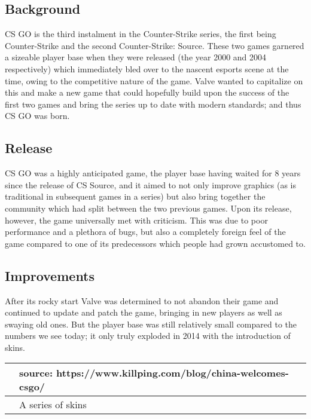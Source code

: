 \documentclass[a4paper,10pt]{book}
\begin{document}
 \subsection{Background }
 
          CS GO is the third instalment in the Counter-Strike series, the first being Counter-Strike and the
          second Counter-Strike: Source. These two games garnered a sizeable player base when they were
          released (the year 2000 and 2004 respectively) which immediately bled over to the nascent esports
          scene at the time, owing to the competitive nature of the game. Valve wanted to capitalize on this
          and make a new game that could hopefully build upon the success of the first two games and bring the
          series up to date with modern standards; and thus CS GO was born.
         
 
 \subsection{Release }
 
          CS GO was a highly anticipated game, the player base having waited for 8 years since the release of
          CS Source, and it aimed to not only improve graphics (as is traditional in subsequent games in a
          series) but also bring together the community which had split between the two previous
          games. Upon its release, however, the game universally met with criticism. This was due to poor
          performance and a plethora of bugs, but also a completely foreign feel of the game compared to
          one of its predecessors which people had grown accustomed to.
         
 
 \subsection{Improvements }
 
          After its rocky start Valve was determined to not abandon their game and continued to update and
          patch the game, bringing in new players as well as swaying old ones. But the player base was still
          relatively small compared to the numbers we see today; it only truly exploded in 2014 with the
          introduction of skins.
         
 
 \begin{longtable}{p{1mm}|l|}\hline
 
 &   source: https://www.killping.com/blog/china-welcomes-csgo/  
 \\\hline
 
 & A series of skins 
 \\\hline
 \end{longtable}
 
\end{document}
